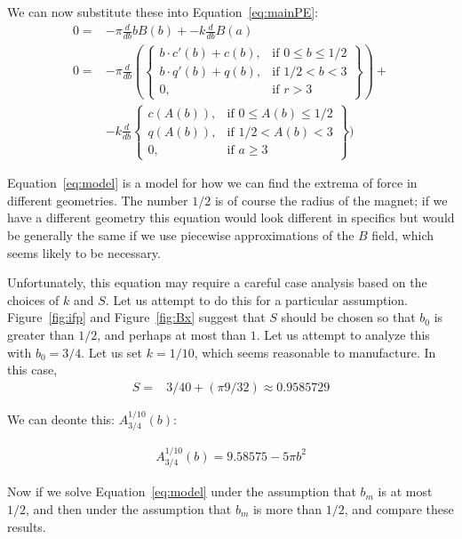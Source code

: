 \documentclass[]{asme2ej}
\begin{document}
We can now substitute these into Equation~\ref{eq:mainPE}:
\begin{align}
    0 = & -  \pi  \frac{d}{db} b B(b) +  - k \frac{d}{db} B(a) \\
  0 = & - \pi \frac{d}{db} (
  \left\{
  \begin{array}{lr}
      b \cdot c'(b) + c(b) , & \text{if } 0 \leq b \leq 1/2 \\
      b \cdot q'(b) + q(b), & \text{if } 1/2 < b < 3 \\
      0  , & \text{if } r > 3
    \end{array}
  \right\}) +
  \\
  & - k \frac{d}{db}  \left\{
  \begin{array}{lr}
      c(A(b)) , & \text{if } 0 \leq A(b) \leq 1/2 \\
      q(A(b)) , & \text{if } 1/2 < A(b) < 3 \\
      0 , & \text{if } a \geq 3
  \end{array}
  \right\})
  \label{eq:model}
\end{align}

Equation~\ref{eq:model} is a model for how we can find the extrema of force in different geometries.
The number $1/2$ is of
course the radius of the magnet; if we have a different geometry this equation
would look different in specifics but would be generally the same if we use piecewise approximations
of the $B$ field, which seems likely to be necessary.

Unfortunately, this equation may require a careful case analysis based on the choices of $k$ and $S$.
Let us attempt to do this for a particular assumption.
Figure~\ref{fig:ifp} and Figure~\ref{fig:Bx} suggest that $S$ should be chosen so that $b_0$ is
greater than $1/2$, and perhaps at most than $1$. Let us attempt to analyze this with $b_0 = 3/4$. Let us set $k = 1/10$, which seems reasonable to manufacture.
In this case,
\begin{align}
  S = & 3/40 + (\pi 9/32) \approx 0.9585729
\end{align}

We can deonte this: $A_{3/4}^{1/10}(b)$:

\begin{align}
  A_{3/4}^{1/10}(b) =  9.58575 - 5 \pi b^2
\end{align}


Now if we solve Equation~\ref{eq:model} under the assumption that $b_m$ is at most $1/2$, and
then under the assumption that $b_m$ is more than $1/2$, and compare these results.
\end{document}
